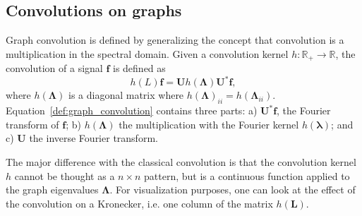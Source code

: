 \documentclass[final,twocolumn,3p,times,authoryear]{elsarticle}
\newcommand{\nati}[1]{{\color[rgb]{.1,.6,.1}{#1}}}
\newcommand{\todo}[1]{{\color[rgb]{.6,.1,.6}{#1}}}
\newcommand{\assign}[1]{{\color[rgb]{.8,.5,.8}{Assigned: #1 }}}
\renewcommand{\b}[1]{{\bm{#1}}}   %
\newcommand{\1}{\b{1}}              %
\newcommand{\0}{\b{0}}              %
\renewcommand{\L}{\b{L}} %
\newcommand{\U}{\b{U}}
\newcommand{\bLambda}{\b{\Lambda}}
\newcommand{\blambda}{\b{\lambda}}
\begin{document}
\subsection{Convolutions on graphs}
\assign{Nathanaël, Michaël} \todo{Add a few extra references}

Graph convolution is defined by generalizing the concept that convolution is a
multiplication in the spectral domain. Given a convolution kernel
$h:\mathbb{R}_+\rightarrow\mathbb{R}$, the convolution of a signal $\b{f}$
is defined as
\begin{equation} \label{def:graph_convolution}
h(L)\b{f} = \U h(\bLambda) \U^* \b{f},
\end{equation}
where $h(\bLambda)$ is a diagonal matrix where $h(\bLambda)_{ii}=h(\bLambda_{ii})$.
Equation~\ref{def:graph_convolution} contains three parts: a) $\U^* \b{f}$, the
Fourier transform of $\b{f}$; b) $h(\bLambda)$ the multiplication with the Fourier
kernel $h(\blambda)$; and c) $\U$ the inverse Fourier transform.

The major difference with the classical convolution is that the convolution kernel
$h$ cannot be thought as a $n \times n$ pattern, but is a continuous function
applied to the graph eigenvalues $\bLambda$. For visualization purposes, one can
look at the effect of the convolution on a Kronecker, i.e. one column of the matrix
$h(\L)$. \nati{However, due to the non-regularity of the graph (i.e. the fact
that there is not perfect sampling on the sphere), this visualization will
differ from one node to another. In the specific case of the full sphere, these
differences are negligible in most of the cases. When considering only subpart of
the sphere, one will observe important border effects.}
\end{document}
